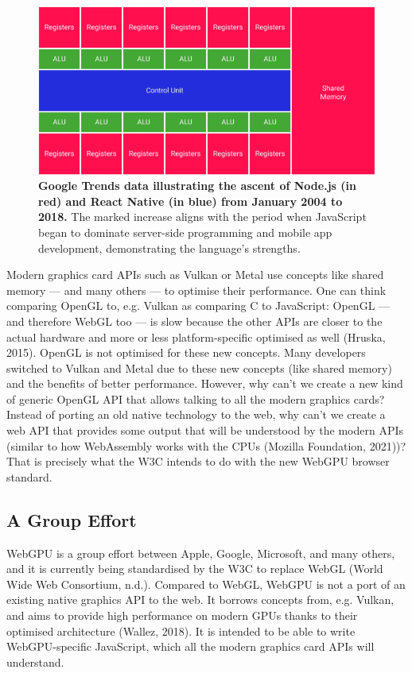 \documentclass[10pt]{article}
\begin{document}
\begin{sloppypar}
  \begin{figure}[ht]
    \centering
    \includegraphics[width=\textwidth]{figures/shared-memory.png}
    \caption[Google Trends data illustrating the ascent of Node.js and React Native.]{\textbf{Google Trends data illustrating the ascent of Node.js (in red) and React Native (in blue) from January 2004 to 2018.} The marked increase aligns with the period when JavaScript began to dominate server-side programming and mobile app development, demonstrating the language’s strengths.}
    \label{fig:shared-memory}
  \end{figure}

  Modern graphics card APIs such as Vulkan or Metal use concepts like shared memory — and many others — to optimise their performance. One can think comparing OpenGL to, e.g. Vulkan as comparing C to JavaScript: OpenGL — and therefore WebGL too — is slow because the other APIs are closer to the actual hardware and more or less platform-specific optimised as well (Hruska, 2015). OpenGL is not optimised for these new concepts. Many developers switched to Vulkan and Metal due to these new concepts (like shared memory) and the benefits of better performance. However, why can’t we create a new kind of generic OpenGL API that allows talking to all the modern graphics cards? Instead of porting an old native technology to the web, why can’t we create a web API that provides some output that will be understood by the modern APIs (similar to how WebAssembly works with the CPUs (Mozilla Foundation, 2021))? That is precisely what the W3C intends to do with the new WebGPU browser standard.

  \subsection{A Group Effort}
  \label{subsec:a-group-effort}

  WebGPU is a group effort between Apple, Google, Microsoft, and many others, and it is currently being standardised by the W3C to replace WebGL (World Wide Web Consortium, n.d.). Compared to WebGL, WebGPU is not a port of an existing native graphics API to the web. It borrows concepts from, e.g. Vulkan, and aims to provide high performance on modern GPUs thanks to their optimised architecture (Wallez, 2018). It is intended to be able to write WebGPU-specific JavaScript, which all the modern graphics card APIs will understand.


\end{sloppypar}
\end{document}
